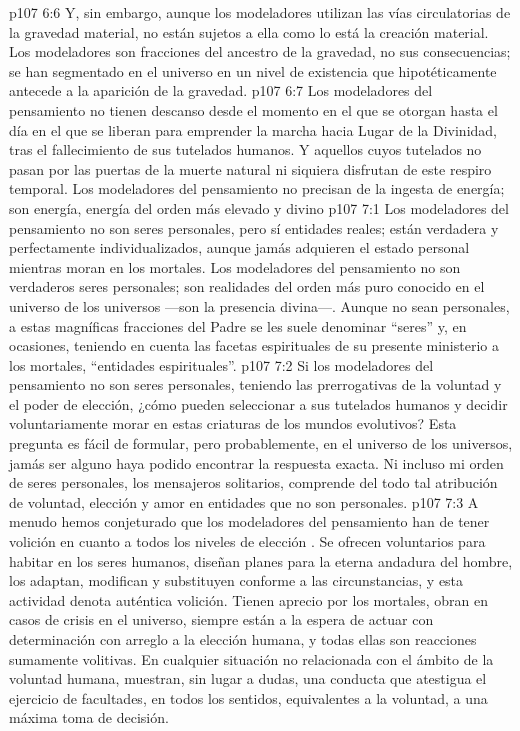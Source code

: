 \vs p107 6:6 Y, sin embargo, aunque los modeladores utilizan las vías circulatorias de la gravedad material, no están sujetos a ella como lo está la creación material. Los modeladores son fracciones del ancestro de la gravedad, no sus consecuencias; se han segmentado en el universo en un nivel de existencia que hipotéticamente antecede a la aparición de la gravedad.
\vs p107 6:7 Los modeladores del pensamiento no tienen descanso desde el momento en el que se otorgan hasta el día en el que se liberan para emprender la marcha hacia Lugar de la Divinidad, tras el fallecimiento de sus tutelados humanos. Y aquellos cuyos tutelados no pasan por las puertas de la muerte natural ni siquiera disfrutan de este respiro temporal. Los modeladores del pensamiento no precisan de la ingesta de energía; son energía, energía del orden más elevado y divino
\vs p107 7:1 Los modeladores del pensamiento no son seres personales, pero sí entidades reales; están verdadera y perfectamente individualizados, aunque jamás adquieren el estado personal mientras moran en los mortales. Los modeladores del pensamiento no son verdaderos seres personales; son  realidades del orden más puro conocido en el universo de los universos ---son la presencia divina---. Aunque no sean personales, a estas magníficas fracciones del Padre se les suele denominar “seres” y, en ocasiones, teniendo en cuenta las facetas espirituales de su presente ministerio a los mortales, “entidades espirituales”.
\vs p107 7:2 Si los modeladores del pensamiento no son seres personales, teniendo las prerrogativas de la voluntad y el poder de elección, ¿cómo pueden seleccionar a sus tutelados humanos y decidir voluntariamente morar en estas criaturas de los mundos evolutivos? Esta pregunta es fácil de formular, pero probablemente, en el universo de los universos, jamás ser alguno haya podido encontrar la respuesta exacta. Ni incluso mi orden de seres personales, los mensajeros solitarios, comprende del todo tal atribución de voluntad, elección y amor en entidades que no son personales.
\vs p107 7:3 A menudo hemos conjeturado que los modeladores del pensamiento han de tener volición en cuanto a todos los niveles de elección . Se ofrecen voluntarios para habitar en los seres humanos, diseñan planes para la eterna andadura del hombre, los adaptan, modifican y substituyen conforme a las circunstancias, y esta actividad denota auténtica volición. Tienen aprecio por los mortales, obran en casos de crisis en el universo, siempre están a la espera de actuar con determinación con arreglo a la elección humana, y todas ellas son reacciones sumamente volitivas. En cualquier situación no relacionada con el ámbito de la voluntad humana, muestran, sin lugar a dudas, una conducta que atestigua el ejercicio de facultades, en todos los sentidos, equivalentes a la voluntad, a una máxima toma de decisión.
